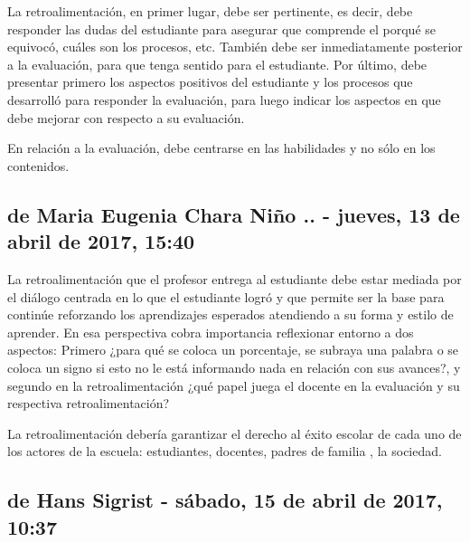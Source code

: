 \documentclass[12pt,letterpaper,article,x11names]{memoir}
\begin{document}
La retroalimentación, en primer lugar, debe ser pertinente, es decir, debe responder las dudas del estudiante para asegurar que comprende el porqué se equivocó, cuáles son los procesos, etc. También debe ser inmediatamente posterior a la evaluación, para que tenga sentido para el estudiante. Por último, debe presentar primero los aspectos positivos del estudiante y los procesos que desarrolló para responder la evaluación, para luego indicar los aspectos en que debe mejorar con respecto a su evaluación.

En relación a la evaluación, debe centrarse en las habilidades y no sólo en los contenidos.

\subsection{de Maria Eugenia Chara Niño .. - jueves, 13 de abril de 2017, 15:40}
\label{sec:org3017700}

La retroalimentación   que el profesor entrega al estudiante   debe estar   mediada por el diálogo centrada en lo que el estudiante logró y que permite ser la base para    continúe reforzando los aprendizajes esperados atendiendo a su forma   y estilo de aprender.  En esa   perspectiva cobra importancia reflexionar entorno a dos aspectos:  Primero ¿para qué se coloca un porcentaje, se subraya una palabra o se coloca un signo si esto no le está informando nada en relación con sus avances?, y segundo en la retroalimentación ¿qué papel juega el docente en la evaluación y su respectiva retroalimentación?

La retroalimentación debería garantizar el derecho   al éxito escolar   de  cada uno de los actores de la escuela: estudiantes, docentes, padres de familia , la sociedad.

\subsection{de Hans Sigrist - sábado, 15 de abril de 2017, 10:37}
\label{sec:org32a676f}
\end{document}
